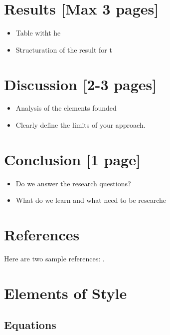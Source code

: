 \documentclass[preprint, 3p,
authoryear]{elsarticle} %
\providecommand{\tightlist}{%
  \setlength{\itemsep}{0pt}\setlength{\parskip}{0pt}}
\begin{document}
\hypertarget{results-max-3-pages}{%
\section{Results {[}Max 3 pages{]}}\label{results-max-3-pages}}

\begin{itemize}
\tightlist
\item
  Table witht he
\item
  Structuration of the result for t
\end{itemize}

\hypertarget{discussion-2-3-pages}{%
\section{Discussion {[}2-3 pages{]}}\label{discussion-2-3-pages}}

\begin{itemize}
\item
  Analysis of the elements founded
\item
  Clearly define the limits of your approach.
\end{itemize}

\hypertarget{conclusion-1-page}{%
\section{Conclusion {[}1 page{]}}\label{conclusion-1-page}}

\begin{itemize}
\tightlist
\item
  Do we answer the research questions?
\item
  What do we learn and what need to be researche
\end{itemize}

\hypertarget{references}{%
\section{References}\label{references}}

Here are two sample references: \citeauthor{Feynman1963118}
\citetext{\citeyear{Feynman1963118}; \citealp{Dirac1953888}}.

\hypertarget{elements-of-style}{%
\section{Elements of Style}\label{elements-of-style}}

\hypertarget{equations}{%
\subsection{Equations}\label{equations}}
\end{document}
